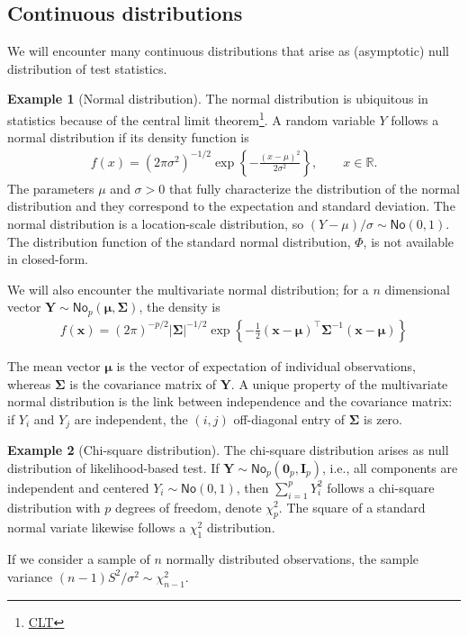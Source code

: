 \documentclass[
  11pt,
  letterpaper,
]{book}
\renewcommand{\href}[2]{#2\footnote{\url{#1}}}
\theoremstyle{definition}
\theoremstyle{definition}
\newtheorem{example}{Example}[chapter]
\theoremstyle{definition}
\theoremstyle{remark}
\begin{document}
\hypertarget{continuous-distributions}{%
\subsection{Continuous distributions}\label{continuous-distributions}}

We will encounter many continuous distributions that arise as (asymptotic) null distribution of test statistics.

\begin{example}[Normal distribution]
\protect\hypertarget{exm:normaldist}{}{\label{exm:normaldist} {} }The normal distribution is ubiquitous in statistics because of the \href{CLT}{central limit theorem}. A random variable \(Y\) follows a normal distribution if its density function is
\begin{align*}
f(x) = (2\pi\sigma^2)^{-1/2} \exp \left\{ - \frac{(x-\mu)^2}{2\sigma^2}\right\}, \qquad x \in \mathbb{R}.
\end{align*}
The parameters \(\mu\) and \(\sigma>0\) that fully characterize the distribution of the normal distribution and they correspond to the expectation and standard deviation. The normal distribution is a location-scale distribution, so \((Y-\mu)/\sigma \sim \mathsf{No}(0, 1)\). The distribution function of the standard normal distribution, \(\Phi\), is not available in closed-form.

We will also encounter the multivariate normal distribution; for a \(n\) dimensional vector \(\boldsymbol{Y} \sim \mathsf{No}_p(\boldsymbol{\mu}, \boldsymbol{\Sigma})\), the density is
\begin{align*}
f(\boldsymbol{x}) = (2\pi)^{-p/2} |\boldsymbol{\Sigma}|^{-1/2} \exp \left\{ - \frac{1}{2} (\boldsymbol{x}-\boldsymbol{\mu})^\top \boldsymbol{\Sigma}^{-1}(\boldsymbol{x}-\boldsymbol{\mu})\right\}
\end{align*}

The mean vector \(\boldsymbol{\mu}\) is the vector of expectation of individual observations, whereas \(\boldsymbol{\Sigma}\) is the covariance matrix of \(\boldsymbol{Y}\). A unique property of the multivariate normal distribution is the link between independence and the covariance matrix: if \(Y_i\) and \(Y_j\) are independent, the \((i,j)\) off-diagonal entry of \(\boldsymbol{\Sigma}\) is zero.
\end{example}

\begin{example}[Chi-square distribution]
\protect\hypertarget{exm:chisqdist}{}{\label{exm:chisqdist} {} }The chi-square distribution arises as null distribution of likelihood-based test. If \(\boldsymbol{Y} \sim \mathsf{No}_p(\boldsymbol{0}_p, \mathbf{I}_p)\), i.e., all components are independent and centered \(Y_i \sim \mathsf{No}(0, 1)\), then \(\sum_{i=1}^p Y_i^2\) follows a chi-square distribution with \(p\) degrees of freedom, denote \(\chi^2_p\). The square of a standard normal variate likewise follows a \(\chi^2_1\) distribution.

If we consider a sample of \(n\) normally distributed observations, the sample variance \((n-1)S^2/\sigma^2 \sim \chi^2_{n-1}\).
\end{example}
\end{document}
